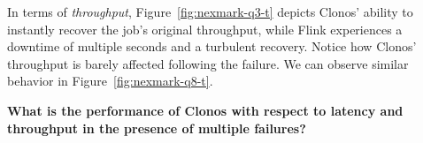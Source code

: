 \documentclass[sigconf]{acmart}
\newcommand{\para}[1]{\vspace{1mm}\noindent\textbf{#1.}}
\begin{document}

In terms of \textit{throughput}, Figure~\ref{fig:nexmark-q3-t} depicts Clonos' ability to instantly recover the job's original throughput, while Flink experiences a downtime of multiple seconds and a turbulent recovery.
Notice how Clonos' throughput is barely affected following the failure. We can observe similar behavior in Figure~\ref{fig:nexmark-q8-t}.

\vspace{3mm}
\begin{myframe}
\textbf{What is the performance of Clonos with respect to latency and  throughput in the presence of multiple failures?}
\end{myframe}
\vspace{2mm}
\end{document}

